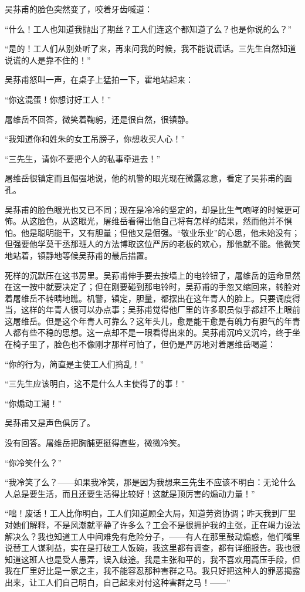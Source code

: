 \par 吴荪甫的脸色突然变了，咬着牙齿喊道：
\par “什么！工人也知道我抛出了期丝？工人们连这个都知道了么？也是你说的么？”
\par “是的！工人们从别处听了来，再来问我的时候，我不能说谎话。三先生自然知道说谎的人是靠不住的！”
\par 吴荪甫怒叫一声，在桌子上猛拍一下，霍地站起来：
\par “你这混蛋！你想讨好工人！”
\par 屠维岳不回答，微笑着鞠躬，还是很自然，很镇静。
\par “我知道你和姓朱的女工吊膀子，你想收买人心！”
\par “三先生，请你不要把个人的私事牵进去！”
\par 屠维岳很镇定而且倔强地说，他的机警的眼光现在微露忿意，看定了吴荪甫的面孔。
\par 吴荪甫的脸色眼光也又已不同；现在是冷冷的坚定的，却是比生气咆哮的时候更可怖。从这脸色，从这眼光，屠维岳看得出他自己将有怎样的结果，然而他并不惧怕。他是聪明能干，又有胆量；但他又是倔强。“敬业乐业”的心思，他未始没有；但强要他学莫干丞那班人的方法博取这位严厉的老板的欢心，那他就不能。他微笑地站着，镇静地等候吴荪甫的最后措置。
\par 死样的沉默压在这书房里。吴荪甫伸手要去按墙上的电铃钮了，屠维岳的运命显然在这一按中就要决定了；但在刚要碰到那电铃时，吴荪甫的手忽又缩回来，转脸对着屠维岳不转睛地瞧。机警，镇定，胆量，都摆出在这年青人的脸上。只要调度得当，这样的年青人很可以办点事；吴荪甫觉得他厂里的许多职员似乎都赶不上眼前这屠维岳。但是这个年青人可靠么？这年头儿，愈是能干愈是有魄力有胆气的年青人都有些不稳的思想。这一点却不是一眼看得出来的。吴荪甫沉吟又沉吟，终于坐在椅子里了，脸色也不像刚才那样可怕了，但仍是严厉地对着屠维岳喝道：
\par “你的行为，简直是主使工人们捣乱！”
\par “三先生应该明白，这不是什么人主使得了的事！”
\par “你煽动工潮！”
\par 吴荪甫又是声色俱厉了。
\par 没有回答。屠维岳把胸脯更挺得直些，微微冷笑。
\par “你冷笑什么？”
\par “我冷笑了么？——如果我冷笑，那是因为我想来三先生不应该不明白：无论什么人总是要生活，而且还要生活得比较好！这就是顶厉害的煽动力量！”
\par “咄！废话！工人比你明白，工人们知道顾全大局，知道劳资协调；昨天我到厂里对她们解释，不是风潮就平静了许多么？工会不是很拥护我的主张，正在竭力设法解决么？我也知道工人中间难免有危险分子，——有人在那里鼓动煽惑，他们嘴里说替工人谋利益，实在是打破工人饭碗，我这里都有调查，都有详细报告。我也很知道这班人也是受人愚弄，误入歧途。我是主张和平的，我不喜欢用高压手段，但我在厂里好比是一家之主，我不能容忍那种害群之马。我只好把这种人的罪恶揭露出来，让工人们自己明白，自己起来对付这种害群之马！——”
